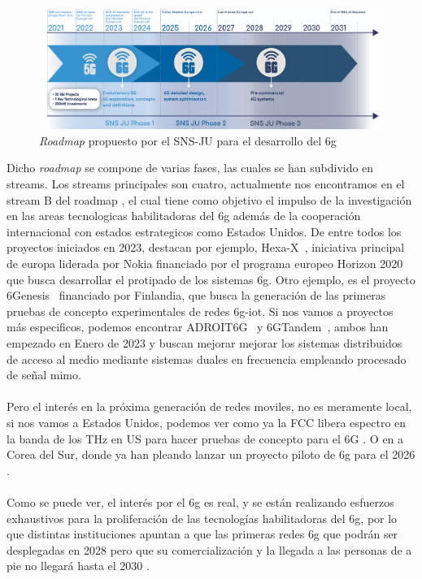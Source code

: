 \begin{figure}[ht]
    \centering
    \includegraphics[width=\textwidth]{archivos/img/intro/banner-screen-1.png}
    \caption{\textit{Roadmap} propuesto por el SNS-JU para el desarrollo del \gls{6g} \cite{eu6gSNS}}
    \label{fig:intro_banner_screen}
\end{figure}


Dicho \textit{roadmap} se compone de varias fases, las cuales se han subdivido en streams. Los streams principales son cuatro, actualmente nos encontramos en el stream B del roadmap \cite{eu6GFase2}, el cual tiene como objetivo el impulso de la investigación en las areas tecnologicas habilitadoras del \gls{6g} además de la cooperación internacional con estados estrategicos como Estados Unidos. De entre todos los proyectos iniciados en 2023, destacan por ejemplo, Hexa-X~\cite{9482430}, iniciativa principal de europa liderada por Nokia financiado por el programa europeo Horizon 2020 que busca desarrollar el protipado de los sistemas \gls{6g}. Otro ejemplo, es el proyecto 6Genesis~\cite{Katz2019} financiado por Finlandia, que busca la generación de las primeras pruebas de concepto experimentales de redes \gls{6g}-\gls{iot}. Si nos vamos a proyectos más especificos, podemos encontrar ADROIT6G~\cite{ADROIT6G} y 6GTandem~\cite{6GTandem}, ambos han empezado en Enero de 2023 y buscan mejorar mejorar los sistemas distribuidos de acceso al medio mediante sistemas duales en frecuencia empleando procesado de señal \gls{mimo}.\\
\\
Pero el interés en la próxima generación de redes moviles, no es meramente local, si nos vamos a Estados Unidos, podemos ver como ya la FCC libera espectro en la banda de los THz en US para hacer pruebas de concepto para el 6G \cite{us6g}. O en a Corea del Sur, donde ya han pleando lanzar un proyecto piloto de \gls{6g} para el 2026 \cite{coreaSur6G}.\\
\\
Como se puede ver, el interés por el \gls{6g} es real, y se están realizando esfuerzos exhaustivos para la proliferación de las tecnologías habilitadoras del \gls{6g}, por lo que distintas instituciones apuntan a que las primeras redes \gls{6g} que podrán ser desplegadas en 2028 pero que su comercialización y la llegada a las personas de a pie no llegará hasta el 2030 \cite{Nguyen2022}.



